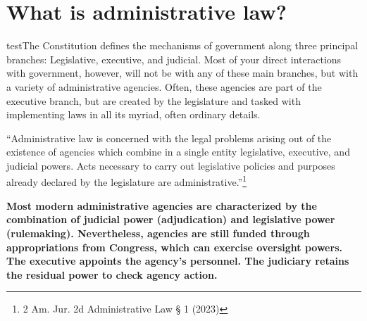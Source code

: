 \documentclass[../main.tex]{subfiles}
\begin{document}
    
\section{What is administrative law?}
testThe Constitution defines the mechanisms of government along three principal branches: Legislative, executive, and judicial. Most of your direct interactions with government, however, will not be with any of these main branches, but with a variety of administrative agencies. Often, these agencies are part of the executive branch, but are created by the legislature and tasked with implementing laws in all its myriad, often ordinary details.

 \enquote{Administrative law is concerned with the legal problems arising out of the existence of agencies which combine in a single entity legislative, executive, and judicial powers. Acts necessary to carry out legislative policies and purposes already declared by the legislature are administrative.}\footnote{2 Am. Jur. 2d Administrative Law § 1 (2023)}

\begin{note}
    \textbf{Most modern administrative agencies are characterized by the combination of judicial power (adjudication) and legislative power (rulemaking). Nevertheless, agencies are still funded through appropriations from Congress, which can exercise oversight powers. The executive appoints the agency's personnel. The judiciary retains the residual power to check agency action.}
\end{note}
\end{document}
